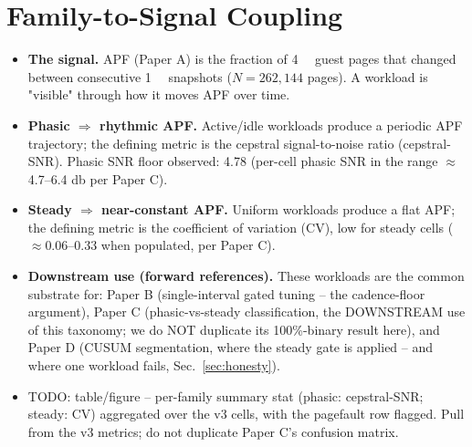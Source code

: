 \documentclass[conference]{IEEEtran}
\begin{document}
\section{Family-to-Signal Coupling}
\label{sec:coupling}
\begin{itemize}
  \item \textbf{The signal.} APF (Paper A) is the fraction of \SI{4}{\kibi\byte}
        guest pages that changed between consecutive \SI{1}{\gibi\byte}
        snapshots ($N = 262{,}144$ pages). A workload is "visible" through how
        it moves APF over time.
  \item \textbf{Phasic $\Rightarrow$ rhythmic APF.} Active/idle workloads
        produce a periodic APF trajectory; the defining metric is the cepstral
        signal-to-noise ratio (cepstral-SNR). Phasic SNR floor observed:
        \num{4.78} (per-cell phasic SNR in the range $\approx$\num{4.7}--\num{6.4}
        \si{\decibel} per Paper C). \cite{TODO_cepstrum}
  \item \textbf{Steady $\Rightarrow$ near-constant APF.} Uniform workloads
        produce a flat APF; the defining metric is the coefficient of variation
        (CV), low for steady cells ($\approx$\num{0.06}--\num{0.33} when
        populated, per Paper C).
  \item \textbf{Downstream use (forward references).} These workloads are the
        common substrate for: Paper B (single-interval gated tuning -- the
        cadence-floor argument), Paper C (phasic-vs-steady classification, the
        DOWNSTREAM use of this taxonomy; we do NOT duplicate its 100\%-binary
        result here), and Paper D (CUSUM segmentation, where the steady gate is
        applied -- and where one workload fails, Sec.~\ref{sec:honesty}).
  \item TODO: table/figure -- per-family summary stat (phasic: cepstral-SNR;
        steady: CV) aggregated over the v3 cells, with the pagefault row
        flagged. Pull from the v3 metrics; do not duplicate Paper C's confusion
        matrix.
\end{itemize}

\end{document}
